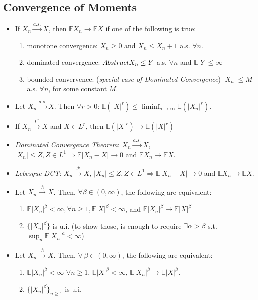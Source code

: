 \documentclass[11pt]{article}
\renewcommand{\P}{\mathbb{P}}
\newcommand{\ga}{\alpha}
\newcommand{\gb}{\beta}
\newcommand\abs[1]{\left|#1\right|}
\renewcommand{\to}{\longrightarrow}
\newcommand{\asto}{\overset{a.s.}{\to}}
\newcommand{\pto}{\overset{\P}{\to}}
\newcommand{\Lp}[1]{\overset{L^#1}\to}
\newcommand{\dto}{\overset{\mathcal{D}}{\to}}
\renewcommand{\P}{\mathcal{P}}
\newcommand{\E}{\mathbb{E}}
\newcommand{\imp}{\Rightarrow}
\newcommand{\seq}[1]{\{#1\}}
\begin{document}
\begin{multicols}{2}
\subsection{Convergence of Moments}
\begin{itemize}
\item If $X_n \asto X$, then $\E X_n \to \E X$ if one of the following is true:
\begin{enumerate}
\item monotone convergence: $X_n \geq 0$ and $X_n \leq X_n+1$ a.s. $\forall n$.
\item dominated convergence: $\abstractname{X_n}\leq Y$ a.s. $\forall n$ and $\E\abs{Y} \leq \infty$
\item bounded convervence: (\textit{special case of Dominated Convergence}) $\abs{X_n}\leq M$ a.s. $\forall n$, for some constant $M$.
\end{enumerate}
\item Let $X_n \asto X$.  Then $\forall r > 0$: $\E(\abs{X}^r) \leq \liminf_{n \to \infty} \E(\abs{X_n}^r)$. 
\item If $X_n \Lp{r} X$ and $X \in L^r$, then $\E(\abs{X}^r) \to \E(\abs{X}^r)$
\item \textit{Dominated Convergence Theorem}: $X_n \asto X$, $\abs{X_n}\leq Z, Z \in L^1 \imp \E \abs{X_n-X} \to 0$ and $\E X_n \to \E X$.
\item \textit{Lebesgue DCT}: $X_n \pto X$, $\abs{X_n} \leq Z, Z \in L^1 \imp \E \abs{X_n-X} \to 0$ and $\E X_n \to \E X$.
\item Let $X_n \dto X$.  Then, $\forall \gb \in (0,\infty)$, the following are equivalent:
\begin{enumerate}
\item $\E \abs{X_n}^\gb < \infty, \forall n \geq 1, \E \abs{X}^\gb<\infty$, and $\E \abs{X_n}^\gb \to \E\abs{X}^\gb $
\item $\seq{\abs{X_n}^\gb}$ is u.i. (to show those, is enough to require $\exists \ga > \gb$ s.t. $\sup_n \E \abs{X_n}^a < \infty$)
\end{enumerate}
\item Let $X_n \dto X$.  Then, $\forall \, \gb \in (0,\infty)$, the following are equivalent:
\begin{enumerate}
\item $\E \abs{X_n}^\gb < \infty$ $\forall n \geq 1$, $\E \abs{X}^\gb < \infty$, $\E\abs{X_n}^\gb \to \E \abs{X}^\gb$.
\item $\seq{\abs{X_n}^\gb}_{n \geq 1}$ is u.i.
\end{enumerate}

\end{itemize}
\end{multicols}
\end{document}
